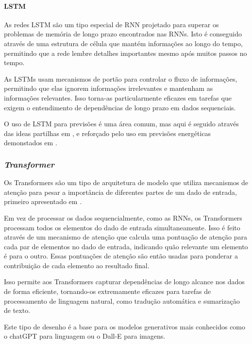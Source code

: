 \paragraph{LSTM\label{se:lstms_sec}}
\text{ }  \par

As redes \gls{LSTM} são um tipo especial de RNN projetado para superar os problemas de memória de longo prazo encontrados nas RNNs. Isto é conseguido através de uma estrutura de célula que mantém informações ao longo do tempo, permitindo que a rede lembre detalhes importantes mesmo após muitos passos no tempo.\par
As \gls{LSTM}s usam mecanismos de portão para controlar o fluxo de informações, permitindo que elas ignorem informações irrelevantes e mantenham as informações relevantes. Isso torna-as particularmente eficazes em tarefas que exigem o entendimento de dependências de longo prazo em dados sequenciais.\par


O uso de \gls{LSTM} para previsões é uma área comum, mas aqui é seguido através das ideas partilhas em \cite{Hewamalage2021}, e reforçado pelo uso em previsões energéticas demonstados em \cite{Costa2022} .\par


\subsubsection{\textit{Transformer}\label{se:transformer_sec}}

Os Transformers são um tipo de arquitetura de modelo que utiliza mecanismos de atenção para pesar a importância de diferentes partes de um dado de entrada, primeiro apresentado em \cite{Vaswani2017}.\par
Em vez de processar os dados sequencialmente, como as RNNs, os Transformers processam todos os elementos do dado de entrada simultaneamente. Isso é feito através de um mecanismo de atenção que calcula uma pontuação de atenção para cada par de elementos no dado de entrada, indicando quão relevante um elemento é para o outro. Essas pontuações de atenção são então usadas para ponderar a contribuição de cada elemento ao resultado final.\par
Isso permite aos Transformers capturar dependências de longo alcance nos dados de forma eficiente, tornando-os extremamente eficazes para tarefas de processamento de linguagem natural, como tradução automática e sumarização de texto.\par
Este tipo de desenho é a base para os modelos generativos mais conhecidos como o chatGPT para linguagem ou o Dall-E para imagens.\par




